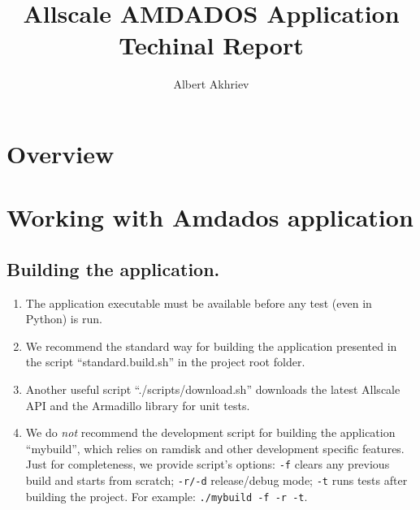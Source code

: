 \documentclass[]{article}
\title{Allscale AMDADOS Application \\ Techinal Report}
\author{Albert Akhriev}
\begin{document}
\maketitle

\section{Overview}

\section{Working with Amdados application}

\subsection{Building the application.}
\begin{enumerate}
\item The application executable must be available before any test (even in Python) is run.
\item We recommend the standard way for building the application presented in the script ``standard.build.sh'' in the project root folder.
\item Another useful script ``./scripts/download.sh'' downloads the latest Allscale API and the Armadillo library for unit tests.
\item We do \textit{not} recommend the development script for building the application ``mybuild'', which relies on ramdisk and other development specific features. Just for completeness, we provide script's options: \texttt{-f} clears any previous build and starts from scratch; \texttt{-r/-d} release/debug mode; \texttt{-t} runs tests after building the project. For example: \texttt{./mybuild -f -r -t}.
\end{enumerate}
\end{document}
